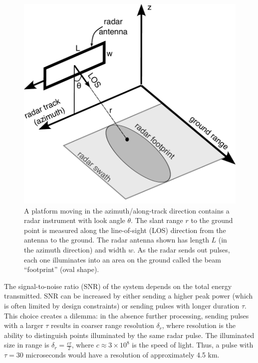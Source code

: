 \begin{figure}
	\centering
		\includegraphics[width=0.99\linewidth]{figures/chapter3-sar/ch3-sar-geometry.pdf}
	\caption[Acquisition geometry of a SAR platform]{
	A platform moving in the azimuth/along-track direction contains a radar instrument with look angle $\theta$.    The slant range $r$ to the ground point is measured along the line-of-sight (LOS) direction from the antenna to the ground.
   	The radar antenna shown has length $L$ (in the azimuth direction) and width $w$.
   	As the radar sends out pulses, each one illuminates into an area on the ground called the beam ``footprint'' (oval shape). 
	}
	\label{fig:ch3-sar-geometry}
\end{figure}



The signal-to-noise ratio (SNR) of the system depends on the total energy transmitted.  SNR can be increased by either sending a higher peak power (which is often limited by design constraints) or sending pulses with longer duration $\tau$. This choice creates a dilemma: in the absence further processing, sending pulses with a larger $\tau$ results in coarser range resolution $\delta_r$, where resolution is the ability to distinguish points illuminated by the same radar pulse. The illuminated size in range is $\delta_r = \frac{c \tau}{2}$, where $c \approx 3 \times 10^8$ is the speed of light. Thus, a pulse with $\tau = 30 $ microseconds would have a resolution of approximately 4.5 km. 


